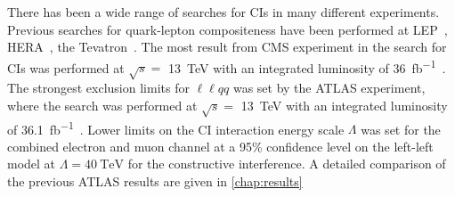 There has been a wide range of searches for CIs in many different experiments. Previous searches for quark-lepton compositeness have been performed at LEP~\cite{Schael:2006wu,Abdallah:2005ph}, HERA~\cite{Wing:2013sv,Chekanov:2003pw}, the Tevatron~\cite{Orejudos:2002ua,Abbott:1998rr}. The most result from CMS experiment in the search for CIs was performed at $\sqrt{s} = $ \SI{13}{\tera\electronvolt} with an integrated luminosity of \SI{36}{\femto\barn^{-1}}~\cite{Sirunyan:2018ipj}. The strongest exclusion limits for $\ell\ell qq$ was set by the ATLAS experiment, where the search was performed at $\sqrt{s} = $ \SI{13}{\tera\electronvolt} with an integrated luminosity of \SI{36.1}{\femto\barn^{-1}}~\cite{EXOT-2016-05}. Lower limits on the CI interaction energy scale $\Lambda$ was set for the combined electron and muon channel at a 95\% confidence level on the left-left model at $\Lambda = \SI{40}{\tera\electronvolt}$ for the constructive interference. A detailed comparison of the previous ATLAS results are given in \cref{chap:results}


